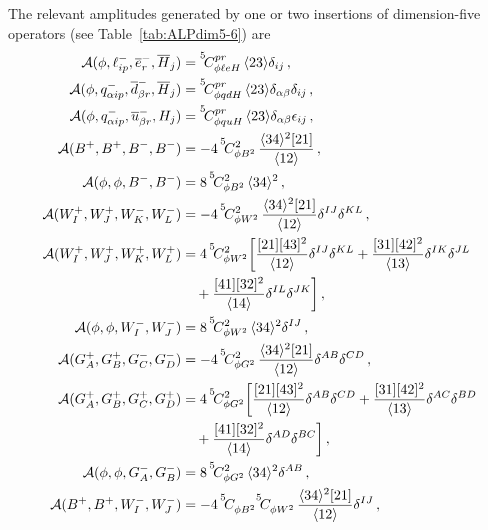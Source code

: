 The relevant amplitudes generated by one or two insertions of dimension-five operators (see Table~\ref{tab:ALPdim5-6}) are 
\begin{align}
\mathcal A(\phi,\ell^-_{ip},\overline e^-_{r},\overline H_j) &= \coef{5}{\phi \ell e H}{pr} \,\agl{2}{3}\delta_{ij} \,, 
\\
\mathcal A(\phi,q^-_{\alpha ip},\overline d^-_{\beta r},\overline H_j) &= \coef{5}{\phi qd H}{pr} \,\agl{2}{3}\delta_{\alpha\beta}\delta_{ij}\,, 
\\
\mathcal A(\phi,q^-_{\alpha ip},\overline u^-_{\beta r}, H_j) &= \coef{5}{\phi qu H}{pr} \,\agl{2}{3}\delta_{\alpha\beta}\epsilon_{ij}\,, 
\\
    \mathcal A(B^+,B^+,B^-,B^-) &= - 4\, \coef{5}{\phi B^2}{2}\,\frac{\agl{3}{4}^2 \sqr{2}{1}}{\agl{1}{2}}\,,  
    \\
    \mathcal A(\phi,\phi,B^-,B^-) &= 8\,\coef{5}{\phi B^2}{2}\,\agl{3}{4}^2\,,
    \\
    \mathcal A(W_I^+,W_J^+,W_K^-,W_L^-) &= - 4\, \coef{5}{\phi W^2}{2}\,\frac{\agl{3}{4}^2 \sqr{2}{1}}{\agl{1}{2}}\delta^{IJ}\delta^{KL}\,, 
    \\
    \mathcal A(W_I^+,W_J^+,W_K^+,W_L^+) &= 4\, \coef{5}{\phi W^2}{2} \bigg[\frac{\sqr{2}{1}\sqr{4}{3}^2}{\agl{1}{2}}\delta^{IJ}\delta^{KL}+\frac{\sqr{3}{1}\sqr{4}{2}^2}{\agl{1}{3}}\delta^{IK}\delta^{JL}\nonumber \\&\quad +\frac{\sqr{4}{1}\sqr{3}{2}^2}{\agl{1}{4}}\delta^{IL}\delta^{JK}\bigg]\,, 
    \\
    \mathcal A(\phi,\phi,W_I^-,W_J^-) &= 8\,\coef{5}{\phi W^2}{2}\,\agl{3}{4}^2 \delta^{IJ}\,,
    \\
    \mathcal A(G_A^+,G_B^+,G_C^-,G_D^-) &= - 4\, \coef{5}{\phi G^2}{2}\,\frac{\agl{3}{4}^2 \sqr{2}{1}}{\agl{1}{2}}\delta^{AB}\delta^{CD}\,, 
    \\
    \mathcal A(G_A^+,G_B^+,G_C^+,G_D^+) &= 4\, \coef{5}{\phi G^2}{2} \bigg[\frac{\sqr{2}{1}\sqr{4}{3}^2}{\agl{1}{2}}\delta^{AB}\delta^{CD}+\frac{\sqr{3}{1}\sqr{4}{2}^2}{\agl{1}{3}}\delta^{AC}\delta^{BD}\nonumber \\&\quad+\frac{\sqr{4}{1}\sqr{3}{2}^2}{\agl{1}{4}}\delta^{AD}\delta^{BC}\bigg] \,, 
    \\
    \mathcal A(\phi,\phi,G_A^-,G_B^-) &= 8\,\coef{5}{\phi G^2}{2}\,\agl{3}{4}^2 \delta^{AB}\,,
    \\
    \mathcal A(B^+,B^+,W_I^-,W_J^-) &= - 4\, \coef{5}{\phi B^2}{}\coef{5}{\phi W^2}{}\,\frac{\agl{3}{4}^2 \sqr{2}{1}}{\agl{1}{2}}\delta^{IJ} \,, 
    \\

\end{align}
